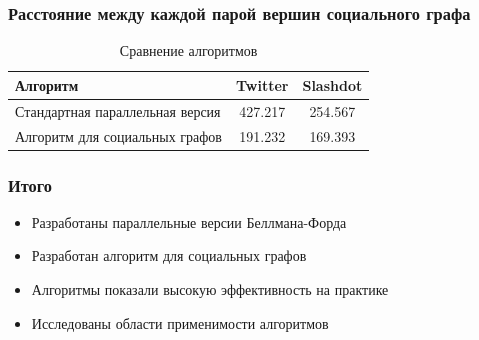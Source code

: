 \documentclass[10pt, compress]{beamer}
\begin{document}
\begin{frame}[fragile]
  \frametitle{Расстояние между каждой парой вершин социального графа}

\begin{table}
\centering

\begin{tabular}{l|c|c}  
Алгоритм & Twitter & Slashdot\\
\hline\hline
Стандартная параллельная версия & 427.217 & 254.567 \\  
Алгоритм для социальных графов & \textcolor{cssgreen}{191.232} & \textcolor{cssgreen}{169.393}  \\
\hline
\end{tabular}

\caption{Сравнение алгоритмов}
\label {table:algo_floyd_comparison}
\end{table}
  
\end{frame}


\begin{frame}[fragile]
  \frametitle{Итого}
  \begin{itemize}
    \item Разработаны параллельные версии Беллмана-Форда 
    \item Разработан алгоритм для социальных графов
    \item Алгоритмы показали высокую эффективность на практике
    \item Исследованы области применимости алгоритмов
  \end{itemize}
\end{frame}
\end{document}
